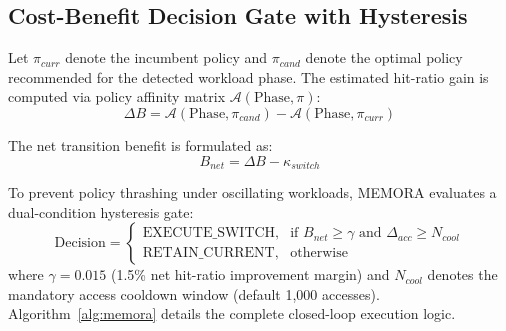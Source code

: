 \documentclass[conference]{IEEEtran}
\begin{document}
\subsection{Cost-Benefit Decision Gate with Hysteresis}
Let $\pi_{curr}$ denote the incumbent policy and $\pi_{cand}$ denote the optimal policy recommended for the detected workload phase. The estimated hit-ratio gain is computed via policy affinity matrix $\mathcal{A}(\text{Phase}, \pi)$:
\begin{equation}
\Delta B = \mathcal{A}(\text{Phase}, \pi_{cand}) - \mathcal{A}(\text{Phase}, \pi_{curr})
\end{equation}

The net transition benefit is formulated as:
\begin{equation}
B_{net} = \Delta B - \kappa_{switch}
\end{equation}

To prevent policy thrashing under oscillating workloads, MEMORA evaluates a dual-condition hysteresis gate:
\begin{equation}
\label{eq:decision_gate}
\text{Decision} = \begin{cases}
\text{EXECUTE\_SWITCH}, & \text{if } B_{net} \ge \gamma \text{ and } \Delta_{acc} \ge N_{cool} \\
\text{RETAIN\_CURRENT}, & \text{otherwise}
\end{cases}
\end{equation}
where $\gamma = 0.015$ (1.5\% net hit-ratio improvement margin) and $N_{cool}$ denotes the mandatory access cooldown window (default 1,000 accesses). Algorithm~\ref{alg:memora} details the complete closed-loop execution logic.
\end{document}
